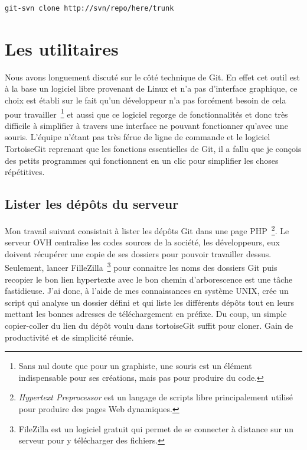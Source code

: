 \begin{lstlisting}
git-svn clone http://svn/repo/here/trunk
\end{lstlisting}

\section{Les utilitaires} %

Nous avons longuement discuté sur le côté technique de Git. En effet cet outil
est à la base un logiciel libre provenant de Linux et n'a pas d'interface
graphique, ce choix est établi sur le fait qu'un développeur n'a pas forcément
besoin de cela pour travailler\, \footnote{Sans nul doute que pour un
graphiste, une souris est un élément indispensable pour ses créations, mais pas
pour produire du code.} et aussi que ce logiciel regorge de fonctionnalités et
donc très difficile à simplifier à travers une interface ne pouvant fonctionner
qu'avec une souris. L'équipe n'étant pas très férue de ligne de commande et le
logiciel TortoiseGit reprenant que les fonctions essentielles de Git, il a
fallu que je conçois des petits programmes qui fonctionnent en un clic pour
simplifier les choses répétitives.


\subsection{Lister les dépôts du serveur}

Mon travail suivant consistait à lister les dépôts Git dans une page PHP\,
\footnote{\emph{Hypertext Preprocessor} est un langage de scripts libre
principalement utilisé pour produire des pages Web dynamiques.}. Le serveur OVH
centralise les codes sources de la société, les développeurs, eux doivent
récupérer une copie de ses dossiers pour pouvoir travailler dessus. Seulement,
lancer FilleZilla\, \footnote{FileZilla est un logiciel gratuit qui permet de
se connecter à distance sur un serveur pour y télécharger des fichiers.} pour
connaitre les noms des dossiers Git puis recopier le bon lien hypertexte avec
le bon chemin d'arborescence est une tâche fastidieuse.  J'ai donc, à l'aide de
mes connaissances en système UNIX, crée un script qui analyse un dossier défini
et qui liste les différents dépôts tout en leurs mettant les bonnes adresses de
téléchargement en préfixe. Du coup, un simple copier-coller du lien du dépôt
voulu dans tortoiseGit suffit pour cloner. Gain de productivité et de
simplicité réunie.

